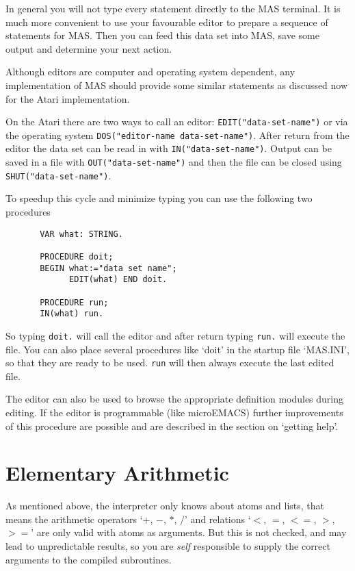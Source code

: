 In general you will not type every statement directly to the MAS 
terminal. It is much more convenient to use your favourable 
editor 
to prepare a sequence of statements for MAS. 
Then you can feed this
data set into MAS, save some output and 
determine your next action.

Although editors are computer and 
operating system dependent, 
any implementation of MAS should provide 
some similar statements as discussed
now for the Atari implementation.

On the Atari there are two ways to call an editor:
\verb/EDIT("data-set-name")/ or via the 
operating system 
\verb/DOS("editor-name data-set-name")/.
After return from the editor the data set can be read in 
with 
\verb/IN("data-set-name")/. Output can be saved in a file with
\verb/OUT("data-set-name")/ and then the file can be closed 
using 
\verb/SHUT("data-set-name")/.

To speedup this cycle and minimize typing 
you can use the following two procedures

\begin{verbatim}
       VAR what: STRING.

       PROCEDURE doit;
       BEGIN what:="data set name";
             EDIT(what) END doit.

       PROCEDURE run;
       IN(what) run.
\end{verbatim}

So typing \verb/doit./ will call the editor and after return
typing \verb/run./ will execute the file. You can also place
several procedures like `doit' in the startup file
`MAS.INI', so that they are ready to be used. 
\verb/run/ will then always execute the last edited file. 

The editor can also be used to browse the appropriate 
definition modules during editing.
If the editor is programmable (like microEMACS)
further improvements of this procedure are possible 
and are described in the section on `getting help'.


\section{Elementary Arithmetic}

As mentioned above, the interpreter only knows about atoms and 
lists,
that means the arithmetic 
operators `$+$, $-$, $*$, $/$' and relations 
`$<$, $=$, $<=$, $>$, $>=$' are only valid with atoms as arguments. 
But this is not checked,
and may lead to unpredictable results, so you are {\em self}
responsible to supply the correct arguments to the 
compiled subroutines. 

